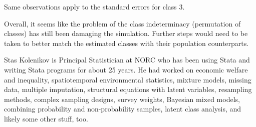 \begin{stlog} 
  \nullskip
\end{stlog}

Same observations apply to the standard errors for class 3.

\begin{stlog} 
  \nullskip
\end{stlog}

Overall, it seems like the problem of the class indeterminacy
(permutation of classes) has still been damaging the simulation.
Further steps would need to be taken to better match the estimated
classes with their population counterparts.

\newpage

% 
% 




\begin{aboutauthors}
Stas Kolenikov is Principal Statistician at NORC who has been
using Stata and writing Stata programs for about 25 years.
He had worked on economic welfare and inequality, spatiotemporal
environmental statistics, mixture models, missing data,
multiple imputation, structural equations with latent variables,
resampling methods, complex sampling designs, survey weights,
Bayesian mixed models, combining probability and non-probability samples,
latent class analysis, and likely some other stuff, too.
\end{aboutauthors}

\endinput
